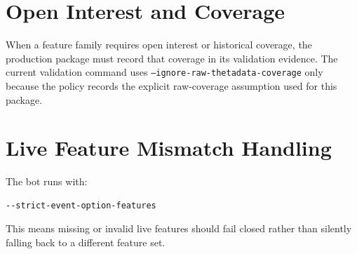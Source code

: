 \documentclass[11pt,a4paper]{article}
\begin{document}
\section{Open Interest and Coverage}

When a feature family requires open interest or historical coverage, the production package must record that coverage in its validation evidence. The current validation command uses \texttt{--ignore-raw-thetadata-coverage} only because the policy records the explicit raw-coverage assumption used for this package.

\section{Live Feature Mismatch Handling}

The bot runs with:

\begin{lstlisting}
--strict-event-option-features
\end{lstlisting}

This means missing or invalid live features should fail closed rather than silently falling back to a different feature set.
\end{document}
